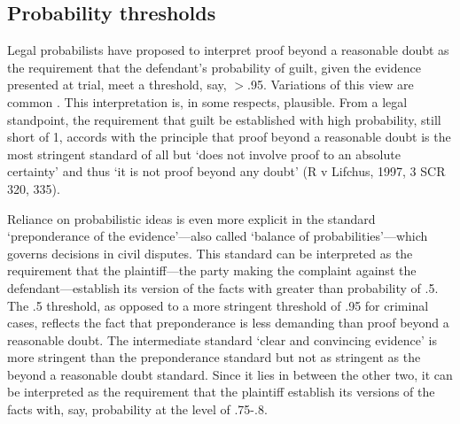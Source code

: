 \documentclass{article}
\begin{document}
\subsection{Probability thresholds}


Legal probabilists have proposed to interpret proof beyond a reasonable 
doubt as the requirement that the defendant's probability of guilt, given the evidence presented at trial, meet a threshold, say, $>$.95. Variations of this view are common  \citep[see, for exmaple,][]{Bernoulli1713Ars-conjectandi, Laplace1814,  kaplan1968decision, Dekay1996, kaye79, laudan2006truth}. This interpretation is, in some respects, plausible. %
From a legal standpoint, the requirement that guilt be established with high probability, still short of 1, accords with the  principle that proof beyond a reasonable doubt is the most stringent standard of all but %
`does not involve proof to an absolute certainty' and thus `it is not proof beyond any doubt' (R v Lifchus, 1997, 3 SCR 320, 335).



Reliance on probabilistic ideas is even more explicit in the standard `preponderance of the evidence'---also called `balance of probabilities'---which governs decisions in civil disputes. This standard can be interpreted as the requirement that the plaintiff---the party making the complaint against the defendant---establish its version of the facts with greater than probability of .5. The .5 threshold, as opposed to a more stringent threshold of .95 for criminal cases, reflects the fact that  preponderance is less demanding than proof beyond a reasonable doubt. The intermediate standard `clear and convincing evidence' is more stringent than the preponderance standard but not as stringent as the beyond a reasonable doubt standard. Since it lies in between the other two, it can be interpreted as the requirement that the plaintiff establish its versions of the facts with, say, probability at the level of .75-.8.
\end{document}
